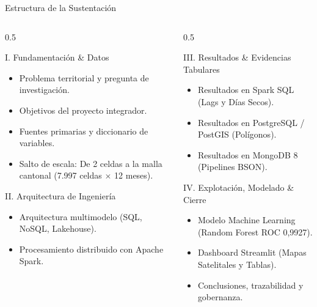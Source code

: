 \documentclass[aspectratio=169,11pt]{beamer}
\newcommand{\seccionactual}{Sustentaci\'on Final}
\begin{document}
\renewcommand{\seccionactual}{Contenido}
\begin{frame}{Estructura de la Sustentaci\'on}
  \begin{columns}[t]
    \begin{column}{0.5\textwidth}
      \begin{block}{I. Fundamentaci\'on \& Datos}
        \begin{itemize}\small
          \item Problema territorial y pregunta de investigaci\'on.
          \item Objetivos del proyecto integrador.
          \item Fuentes primarias y diccionario de variables.
          \item Salto de escala: De 2 celdas a la malla cantonal (7.997 celdas $\times$ 12 meses).
        \end{itemize}
      \end{block}
      \begin{block}{II. Arquitectura de Ingenier\'ia}
        \begin{itemize}\small
          \item Arquitectura multimodelo (SQL, NoSQL, Lakehouse).
          \item Procesamiento distribuido con Apache Spark.
        \end{itemize}
      \end{block}
    \end{column}
    \begin{column}{0.5\textwidth}
      \begin{block}{III. Resultados \& Evidencias Tabulares}
        \begin{itemize}\small
          \item Resultados en Spark SQL (Lags y D\'ias Secos).
          \item Resultados en PostgreSQL / PostGIS (Pol\'igonos).
          \item Resultados en MongoDB 8 (Pipelines BSON).
        \end{itemize}
      \end{block}
      \begin{block}{IV. Explotaci\'on, Modelado \& Cierre}
        \begin{itemize}\small
          \item Modelo Machine Learning (Random Forest ROC 0,9927).
          \item Dashboard Streamlit (Mapas Satelitales y Tablas).
          \item Conclusiones, trazabilidad y gobernanza.
        \end{itemize}
      \end{block}
    \end{column}
  \end{columns}
\end{frame}
\end{document}
